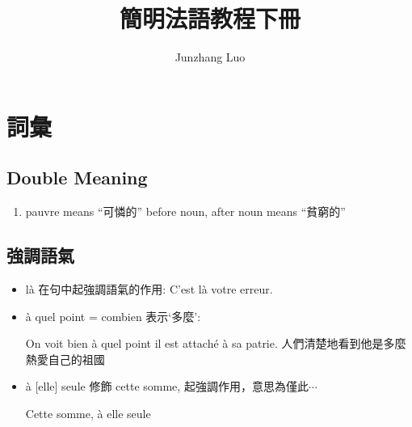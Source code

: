 \documentclass{book}
\title{簡明法語教程下冊}
\author{Junzhang Luo}
\begin{document}
\maketitle
\tableofcontents

\chapter{詞彙}

    \section{Double Meaning}
        \begin{enumerate}
            \item pauvre means ``可憐的'' before noun, after noun means ``貧窮的''
        \end{enumerate}

    \section{強調語氣}
        \begin{itemize}
            \item là 在句中起強調語氣的作用: C'est là votre erreur.
            \item à quel point = combien 表示`多麼': 
                \begin{center}
                    On voit bien à quel point il est attaché à sa patrie. 人們清楚地看到他是多麼熱愛自己的祖國
                \end{center}
            \item à [elle] seule 修飾 cette somme, 起強調作用，意思為僅此$\cdots$
                \begin{center}
                    Cette somme, à elle seule
                \end{center}
        \end{itemize}
\end{document}
